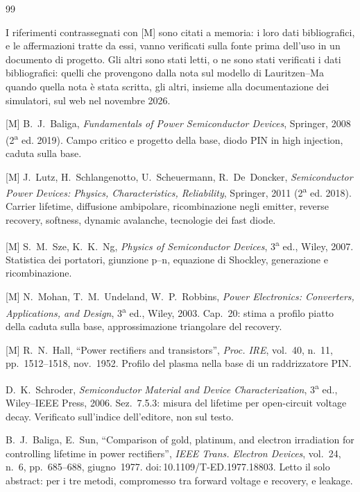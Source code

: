 \documentclass[10pt,a4paper]{scrartcl}
\begin{document}
\begin{thebibliography}{99}\setlength{\parskip}{3pt minus 1pt}\def\UrlBreaks{\do\/\do\_\do\.}
\small
\item[] I riferimenti contrassegnati con [M] sono citati a memoria: i loro dati bibliografici, e le affermazioni tratte da essi, vanno verificati sulla fonte prima dell'uso in un documento di progetto. Gli altri sono stati letti, o ne sono stati verificati i dati bibliografici: quelli che provengono dalla nota sul modello di Lauritzen--Ma quando quella nota è stata scritta, gli altri, insieme alla documentazione dei simulatori, sul web nel novembre 2026.

[M] B.~J.~Baliga, \emph{Fundamentals of Power Semiconductor Devices}, Springer, 2008 (2\textsuperscript{a} ed. 2019). Campo critico e progetto della base, diodo PIN in high injection, caduta sulla base.

[M] J.~Lutz, H.~Schlangenotto, U.~Scheuermann, R.~De~Doncker, \emph{Semiconductor Power Devices: Physics, Characteristics, Reliability}, Springer, 2011 (2\textsuperscript{a} ed. 2018). Carrier lifetime, diffusione ambipolare, ricombinazione negli emitter, reverse recovery, softness, dynamic avalanche, tecnologie dei fast diode.

[M] S.~M.~Sze, K.~K.~Ng, \emph{Physics of Semiconductor Devices}, 3\textsuperscript{a} ed., Wiley, 2007. Statistica dei portatori, giunzione p--n, equazione di Shockley, generazione e ricombinazione.

[M] N.~Mohan, T.~M.~Undeland, W.~P.~Robbins, \emph{Power Electronics: Converters, Applications, and Design}, 3\textsuperscript{a} ed., Wiley, 2003. Cap.~20: stima a profilo piatto della caduta sulla base, approssimazione triangolare del recovery.

[M] R.~N.~Hall, ``Power rectifiers and transistors'', \emph{Proc. IRE}, vol.~40, n.~11, pp.~1512--1518, nov.~1952. Profilo del plasma nella base di un raddrizzatore PIN.

D.~K.~Schroder, \emph{Semiconductor Material and Device Characterization}, 3\textsuperscript{a} ed., Wiley--IEEE Press, 2006. Sez.~7.5.3: misura del lifetime per open-circuit voltage decay. Verificato sull'indice dell'editore, non sul testo.

B.~J.~Baliga, E.~Sun, ``Comparison of gold, platinum, and electron irradiation for controlling lifetime in power rectifiers'', \emph{IEEE Trans. Electron Devices}, vol.~24, n.~6, pp.~685--688, giugno~1977. doi:\,10.1109/T-ED.1977.18803. Letto il solo abstract: per i tre metodi, compromesso tra forward voltage e recovery, e leakage.


\end{thebibliography}
\end{document}

